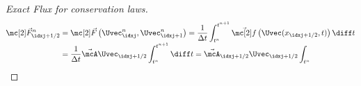 \begin{proofbox}\nospacing
    \begin{proof}[Exact Flux for conservation laws]\label{proof:exact_flux_for_conservation_laws}
        \begin{align*}
          \Fluxvec^{n}_{\idxj+1/2}&=\Fluxvec\left(\Uvec_{\idxj}^{n},\Uvec_{\idxj+1}^{n}\right)
          =\frac{1}{\Delta t}\int_{t^{n}}^{t^{n+1}}\vec{\flux}\left(\Uvec(x_{\idxj+1/2},t)\right)\diff t \\[-1\jot]
          &=\frac{1}{\Delta t}\linfluxvec\Uvec_{\idxj+1/2}\int_{t^{n}}^{t^{n+1}}\diff t
          =\linfluxvec_{\idxj+1/2}\Uvec_{\idxj+1/2}\int_{t^{n}}
        \end{align*}
    \end{proof}
\end{proofbox}
